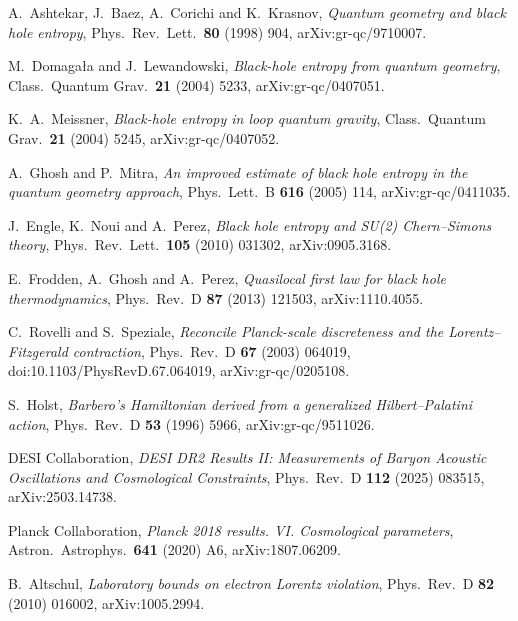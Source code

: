 A.~Ashtekar, J.~Baez, A.~Corichi and K.~Krasnov, \emph{Quantum geometry and black hole entropy},
Phys.\ Rev.\ Lett.\ \textbf{80} (1998) 904, arXiv:gr-qc/9710007.

M.~Domaga{\l}a and J.~Lewandowski, \emph{Black-hole entropy from quantum geometry},
Class.\ Quantum Grav.\ \textbf{21} (2004) 5233, arXiv:gr-qc/0407051.

K.~A.~Meissner, \emph{Black-hole entropy in loop quantum gravity},
Class.\ Quantum Grav.\ \textbf{21} (2004) 5245, arXiv:gr-qc/0407052.

A.~Ghosh and P.~Mitra, \emph{An improved estimate of black hole entropy in the quantum geometry approach},
Phys.\ Lett.\ B \textbf{616} (2005) 114, arXiv:gr-qc/0411035.

J.~Engle, K.~Noui and A.~Perez, \emph{Black hole entropy and SU(2) Chern--Simons theory},
Phys.\ Rev.\ Lett.\ \textbf{105} (2010) 031302, arXiv:0905.3168.

E.~Frodden, A.~Ghosh and A.~Perez, \emph{Quasilocal first law for black hole thermodynamics},
Phys.\ Rev.\ D \textbf{87} (2013) 121503, arXiv:1110.4055.

C.~Rovelli and S.~Speziale, \emph{Reconcile Planck-scale discreteness and the Lorentz--Fitzgerald contraction},
Phys.\ Rev.\ D \textbf{67} (2003) 064019, doi:10.1103/PhysRevD.67.064019, arXiv:gr-qc/0205108.

S.~Holst, \emph{Barbero's Hamiltonian derived from a generalized Hilbert--Palatini action},
Phys.\ Rev.\ D \textbf{53} (1996) 5966, arXiv:gr-qc/9511026.

DESI Collaboration, \emph{DESI DR2 Results II: Measurements of Baryon Acoustic Oscillations and Cosmological Constraints},
Phys.\ Rev.\ D \textbf{112} (2025) 083515, arXiv:2503.14738.

Planck Collaboration, \emph{Planck 2018 results. VI. Cosmological parameters},
Astron.\ Astrophys.\ \textbf{641} (2020) A6, arXiv:1807.06209.

B.~Altschul, \emph{Laboratory bounds on electron Lorentz violation},
Phys.\ Rev.\ D \textbf{82} (2010) 016002, arXiv:1005.2994.
